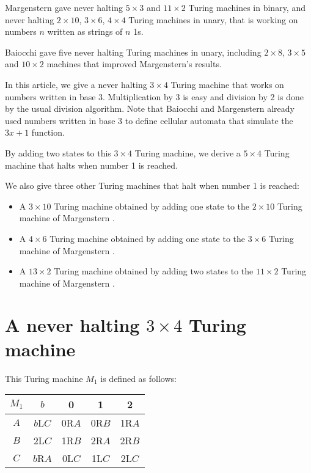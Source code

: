 \documentclass[10pt]{article}
\begin{document}
Margenstern \cite{Ma98,Ma00} gave never halting $5 \times 3$ and $11 \times 2$
Turing machines in binary, and never halting $2 \times 10$, $3 \times 6$,
$4 \times 4$ Turing machines in unary, that is working on numbers $n$ written
as strings of $n$ 1s.

Baiocchi \cite{Ba98} gave five never halting Turing machines in unary, including
$2 \times 8$, $3 \times 5$ and $10 \times 2$ machines that improved
Margenstern's results.

In this article, we give a never halting $3 \times 4$ Turing machine
that works on numbers written in base 3. Multiplication by  3 is easy
and division by 2 is done by the usual division algorithm.
Note that Baiocchi and Margenstern \cite{BM01} already used numbers written in base 3
to define cellular automata that simulate the $3x + 1$ function.

By adding two states to this $3 \times 4$ Turing machine,
we derive a $5 \times 4$ Turing machine that halts when number 1 is reached.

We also give three other Turing machines that halt when number 1 is reached:

\begin{itemize}
\item A $3 \times 10$ Turing machine obtained by adding one state to the
$2 \times 10$ Turing machine of Margenstern \cite{Ma98,Ma00}.
\item A $4 \times 6$ Turing machine obtained by adding one state to the
$3 \times 6$ Turing machine of Margenstern \cite{Ma98,Ma00}.
\item A $13 \times 2$ Turing machine obtained by adding two states to the
$11 \times 2$ Turing machine of Margenstern \cite{Ma98,Ma00}.
\end{itemize}

\section{A never halting $3 \times 4$ Turing machine}
This Turing machine $M_1$ is defined as follows:

\begin{center}
\begin{tabular}{|c|c|c|c|c|}
\hline
$M_1$ &  $b$  &   0   &   1   &   2 \\
\hline
$A$ & $b$L$C$ & 0R$A$ & 0R$B$ & 1R$A$ \\
\hline
$B$ &  2L$C$  & 1R$B$ & 2R$A$ & 2R$B$ \\
\hline
$C$ & $b$R$A$ & 0L$C$ & 1L$C$ & 2L$C$ \\
\hline
\end{tabular}
\end{center}
\end{document}
